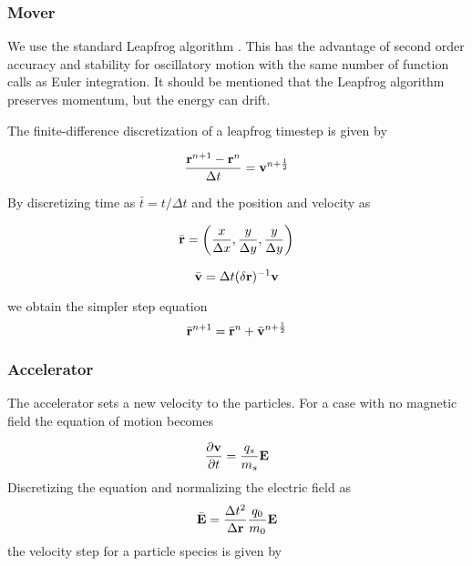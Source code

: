        \subsubsection{Mover}
            We use the standard Leapfrog algorithm \citep{birdsall_plasma_2004}.
			This has the advantage of second order accuracy and stability for oscillatory motion
            with the same number of function calls as Euler integration. It should
            be mentioned that the Leapfrog algorithm preserves momentum, but the
            energy can drift.

            \noindent The finite-difference discretization of a leapfrog timestep is given by

            \begin{equation}
                \frac{\vb{r}^{n+1}-\vb{r}^n}{\Delta t} = \vb{v}^{n+\frac{1}{2}}
            \end{equation}

            \noindent By discretizing time as \(\bar{t}= t/\Delta t\) and the position and velocity as

            \begin{equation}
                    \bar{\vb{r}} = \left( \frac{x}{\Delta x}, \frac{y}{\Delta y}, \frac{y}{\Delta y} \right)
            \end{equation}

            \begin{equation}
                \bar{\vb{v}} = \Delta t (\delta \vb{r})^{-1} \vb{v}
            \end{equation}

            \noindent we obtain the simpler step equation
            \begin{equation}
                \bar{\vb{r}}^{n+1} = \bar{\vb{r}}^{n} + \bar{\vb{v}}^{n+\frac{1}{2}}
            \end{equation}

        \subsubsection{Accelerator}
            The accelerator sets a new velocity to the particles. For a case with
            no magnetic field the equation of motion becomes

            \begin{equation}
                \pdv{\vb{v}}{t} = \frac{q_s}{m_s} \vb{E}
            \end{equation}
%
            Discretizing the equation and normalizing the electric field as
            \begin{equation}
                \bar{\vb{E}} = \frac{\Delta t^2}{\Delta \vb{r}} \frac{q_0}{m_0}\vb{E}
            \end{equation}
%
            the velocity step for a particle species is given by

